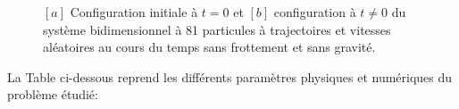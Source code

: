 \begin{figure}[h!] 
    \centering
    \hfill%
    \caption{ $[a]$ Configuration initiale à $t = 0$ et $[b]$  configuration à $t \neq 0$ du système bidimensionnel à 81 particules à trajectoires et vitesses aléatoires au cours du temps sans frottement et sans gravité.}\label{fig312}
\end{figure}

La Table ci-dessous reprend les différents paramètres physiques et numériques du problème étudié:


